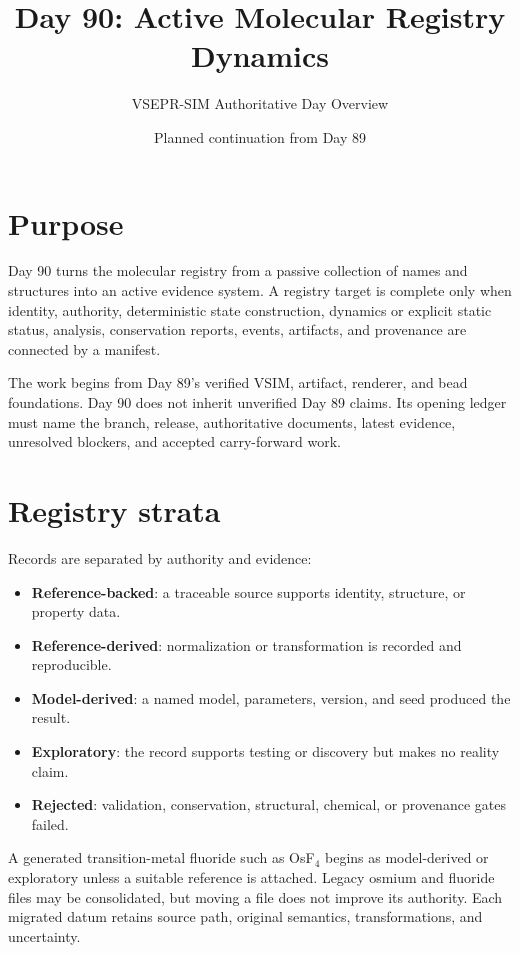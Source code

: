 \documentclass[10pt]{article}
\title{Day 90: Active Molecular Registry Dynamics}
\author{VSEPR-SIM Authoritative Day Overview}
\date{Planned continuation from Day 89}
\begin{document}
\maketitle

\section*{Purpose}
Day 90 turns the molecular registry from a passive collection of names and structures into an active evidence system. A registry target is complete only when identity, authority, deterministic state construction, dynamics or explicit static status, analysis, conservation reports, events, artifacts, and provenance are connected by a manifest.

The work begins from Day 89's verified VSIM, artifact, renderer, and bead foundations. Day 90 does not inherit unverified Day 89 claims. Its opening ledger must name the branch, release, authoritative documents, latest evidence, unresolved blockers, and accepted carry-forward work.

\section*{Registry strata}
Records are separated by authority and evidence:
\begin{itemize}
\item \textbf{Reference-backed}: a traceable source supports identity, structure, or property data.
\item \textbf{Reference-derived}: normalization or transformation is recorded and reproducible.
\item \textbf{Model-derived}: a named model, parameters, version, and seed produced the result.
\item \textbf{Exploratory}: the record supports testing or discovery but makes no reality claim.
\item \textbf{Rejected}: validation, conservation, structural, chemical, or provenance gates failed.
\end{itemize}

A generated transition-metal fluoride such as OsF$_4$ begins as model-derived or exploratory unless a suitable reference is attached. Legacy osmium and fluoride files may be consolidated, but moving a file does not improve its authority. Each migrated datum retains source path, original semantics, transformations, and uncertainty.
\end{document}

